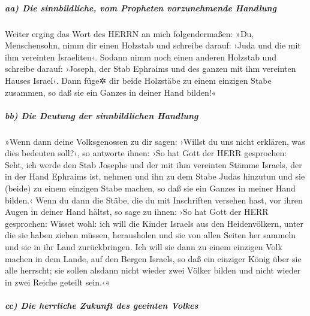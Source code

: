 \hypertarget{aa-die-sinnbildliche-vom-propheten-vorzunehmende-handlung}{%
\subparagraph{aa) Die sinnbildliche, vom Propheten vorzunehmende
Handlung}\label{aa-die-sinnbildliche-vom-propheten-vorzunehmende-handlung}}

Weiter erging das Wort des HERRN an mich folgendermaßen:
»Du, Menschensohn, nimm dir einen Holzstab und schreibe
darauf: ›Juda und die mit ihm vereinten Israeliten‹. Sodann nimm noch
einen anderen Holzstab und schreibe darauf: ›Joseph, der Stab Ephraims
und des ganzen mit ihm vereinten Hauses Israel‹. Dann
füge✲ dir beide Holzstäbe zu einem einzigen Stabe zusammen, so daß sie
ein Ganzes in deiner Hand bilden!«

\hypertarget{bb-die-deutung-der-sinnbildlichen-handlung}{%
\subparagraph{bb) Die Deutung der sinnbildlichen
Handlung}\label{bb-die-deutung-der-sinnbildlichen-handlung}}

»Wenn dann deine Volksgenossen zu dir sagen: ›Willst du
uns nicht erklären, was dies bedeuten soll?‹, so antworte
ihnen: ›So hat Gott der HERR gesprochen: Seht, ich werde den Stab
Josephs und der mit ihm vereinten Stämme Israels, der in der Hand
Ephraims ist, nehmen und ihn zu dem Stabe Judas hinzutun und sie (beide)
zu einem einzigen Stabe machen, so daß sie ein Ganzes in meiner Hand
bilden.‹ Wenn du dann die Stäbe, die du mit Inschriften
versehen hast, vor ihren Augen in deiner Hand hältst, so
sage zu ihnen: ›So hat Gott der HERR gesprochen: Wisset wohl: ich will
die Kinder Israels aus den Heidenvölkern, unter die sie haben ziehen
müssen, herausholen und sie von allen Seiten her sammeln und sie in ihr
Land zurückbringen. Ich will sie dann zu einem einzigen
Volk machen in dem Lande, auf den Bergen Israels, so daß ein einziger
König über sie alle herrscht; sie sollen alsdann nicht wieder zwei
Völker bilden und nicht wieder in zwei Reiche geteilt sein.‹«

\hypertarget{cc-die-herrliche-zukunft-des-geeinten-volkes}{%
\subparagraph{cc) Die herrliche Zukunft des geeinten
Volkes}\label{cc-die-herrliche-zukunft-des-geeinten-volkes}}

